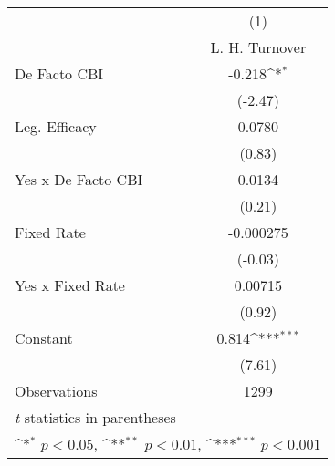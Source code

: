 \begin{table}[htbp]\centering
\def\sym#1{\ifmmode^{#1}\else\(^{#1}\)\fi}
\caption{\label{llpFEDF}}
\begin{tabular}{l*{1}{c}}
\toprule
                                        &\multicolumn{1}{c}{(1)}\\
                                        &\multicolumn{1}{c}{L. H. Turnover}\\
\midrule
De Facto CBI                            &   -0.218\sym{*}  \\
                                        &  (-2.47)         \\
\addlinespace
Leg. Efficacy                           &   0.0780         \\
                                        &   (0.83)         \\
\addlinespace
Yes x De Facto CBI                      &   0.0134         \\
                                        &   (0.21)         \\
\addlinespace
Fixed Rate                              &-0.000275         \\
                                        &  (-0.03)         \\
\addlinespace
Yes x Fixed Rate                        &  0.00715         \\
                                        &   (0.92)         \\
\addlinespace
Constant                                &    0.814\sym{***}\\
                                        &   (7.61)         \\
\midrule
Observations                            &     1299         \\
\bottomrule
\multicolumn{2}{l}{\footnotesize \textit{t} statistics in parentheses}\\
\multicolumn{2}{l}{\footnotesize \sym{*} \(p<0.05\), \sym{**} \(p<0.01\), \sym{***} \(p<0.001\)}\\
\end{tabular}
\end{table}
